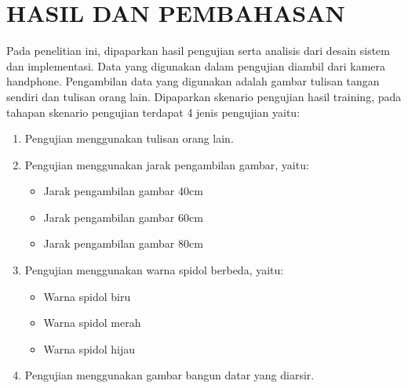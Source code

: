 \chapter{HASIL DAN PEMBAHASAN}
\label{chap:hasilpembahasan}
\setlength{\belowcaptionskip}{-5pt}
Pada penelitian ini, dipaparkan hasil pengujian serta analisis dari desain sistem dan implementasi. Data yang digunakan dalam pengujian diambil dari kamera handphone. Pengambilan data yang digunakan adalah gambar tulisan tangan sendiri dan tulisan orang lain. Dipaparkan skenario pengujian hasil training, pada tahapan skenario pengujian terdapat 4 jenis pengujian yaitu:

\begin{enumerate}[nolistsep, topsep=0pt]
	\item Pengujian menggunakan tulisan orang lain.
	\item Pengujian menggunakan jarak pengambilan gambar, yaitu:
	\begin{itemize}
		\item Jarak pengambilan gambar 40cm
		\item Jarak pengambilan gambar 60cm
		\item Jarak pengambilan gambar 80cm
	\end{itemize}
	\item Pengujian menggunakan warna spidol berbeda, yaitu:
	\begin{itemize}
		\item Warna spidol biru
		\item Warna spidol merah
		\item Warna spidol hijau
	\end{itemize}
	\item Pengujian menggunakan gambar bangun datar yang diarsir.
\end{enumerate}

